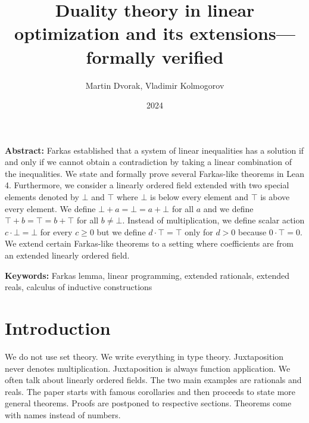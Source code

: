 \documentclass[]{article}
\renewcommand{\.}{\hskip .75pt}
\begin{document}


\title{Duality theory in linear optimization and its extensions\:---\:formally verified}
\author{Martin Dvorak, Vladimir Kolmogorov}
\date{2024}
\maketitle


\noindent \textbf{Abstract:}\;
Farkas established that a system of linear inequalities has a solution if and only if we cannot obtain
a contradiction by taking a linear combination of the inequalities.
We state and formally prove several Farkas-like theorems in Lean 4.
Furthermore, we consider a linearly ordered field extended with two special elements denoted by $\bot$ and $\top$
where $\bot$ is below every element and $\top$ is above every element.
We define $\bot + a = \bot = a + \bot$ for all $a$ and we define $\top + b = \top = b + \top$ for all $b \neq \bot$.
Instead of multiplication, we define scalar action $c \cdot \bot = \bot$ for every $c \ge 0$ but we define
$d \cdot \top = \top$ only for $d > 0$ because $0 \cdot \top = 0$.
We extend certain Farkas-like theorems to a setting where coefficients are from an extended linearly ordered field.
\medskip

\noindent \textbf{Keywords:}\;
Farkas lemma, linear programming, extended rationals, extended reals, calculus of inductive constructions


\section{Introduction}
\label{introduction}

We do not use set theory.
We write everything in type theory.
Juxtaposition never denotes multiplication.
Juxtaposition is always function application.
We often talk about linearly ordered fields.
The two main examples are rationals and reals.
The paper starts with famous corollaries and
then proceeds to state more general theorems.
Proofs are postponed to respective sections.
Theorems come with names instead of numbers.
\end{document}
